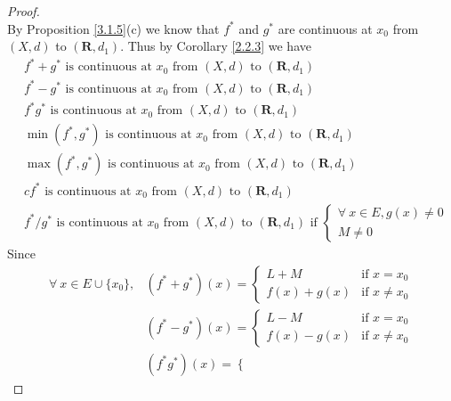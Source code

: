 \begin{proof}
\[    \]
    By Proposition \ref{3.1.5}(c) we know that \(f^*\) and \(g^*\) are continuous at \(x_0\) from \((X, d)\) to \((\mathbf{R}, d_1)\).
    Thus by Corollary \ref{2.2.3} we have
    \begin{align*}
         & f^* + g^* \text{ is continuous at } x_0 \text{ from } (X, d) \text{ to } (\mathbf{R}, d_1)                                        \\
         & f^* - g^* \text{ is continuous at } x_0 \text{ from } (X, d) \text{ to } (\mathbf{R}, d_1)                                        \\
         & f^* g^* \text{ is continuous at } x_0 \text{ from } (X, d) \text{ to } (\mathbf{R}, d_1)                                          \\
         & \min(f^*, g^*) \text{ is continuous at } x_0 \text{ from } (X, d) \text{ to } (\mathbf{R}, d_1)                                   \\
         & \max(f^*, g^*) \text{ is continuous at } x_0 \text{ from } (X, d) \text{ to } (\mathbf{R}, d_1)                                   \\
         & c f^* \text{ is continuous at } x_0 \text{ from } (X, d) \text{ to } (\mathbf{R}, d_1)                                            \\
         & f^* / g^* \text{ is continuous at } x_0 \text{ from } (X, d) \text{ to } (\mathbf{R}, d_1) \text{ if } \begin{cases}
            \forall\ x \in E, g(x) \neq 0 \\
            M \neq 0
        \end{cases}
    \end{align*}
    Since
    \begin{align*}
        \forall\ x \in E \cup \{x_0\}, & (f^* + g^*)(x) = \begin{cases}
            L + M       & \text{if } x = x_0    \\
            f(x) + g(x) & \text{if } x \neq x_0
        \end{cases}                                          \\
                                       & (f^* - g^*)(x) = \begin{cases}
            L - M       & \text{if } x = x_0    \\
            f(x) - g(x) & \text{if } x \neq x_0
        \end{cases}                                          \\
                                       & (f^* g^*)(x) = \begin{cases}

\end{cases}
\end{align*}
\end{proof}
